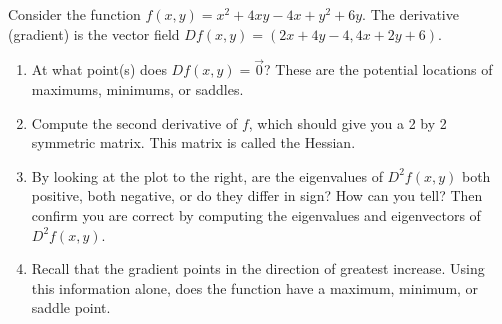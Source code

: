 \begin{problem}
 Consider the function $f(x,y)= x^2+4xy-4x+y^2+6y$. The derivative (gradient) is the vector field $Df(x,y) = (2x+4y-4,4x+2y+6)$. 
\begin{enumerate}
\item 
At what point(s) does $Df(x,y)=\vec 0$? These are the potential locations of maximums, minimums, or saddles.   
\item 
Compute the second derivative of $f$, which should give you a 2 by 2 symmetric matrix. This matrix is called the Hessian.
\item 
By looking at the plot to the right, are the eigenvalues of $D^2f(x,y)$ both positive, both negative, or do they differ in sign?  How can you tell? Then confirm you are correct by computing the eigenvalues and eigenvectors of $D^2f(x,y)$.  
\item 
Recall that the gradient points in the direction of greatest increase.  Using this information alone, does the function have a maximum, minimum, or saddle point.
\end{enumerate}


\end{problem}
